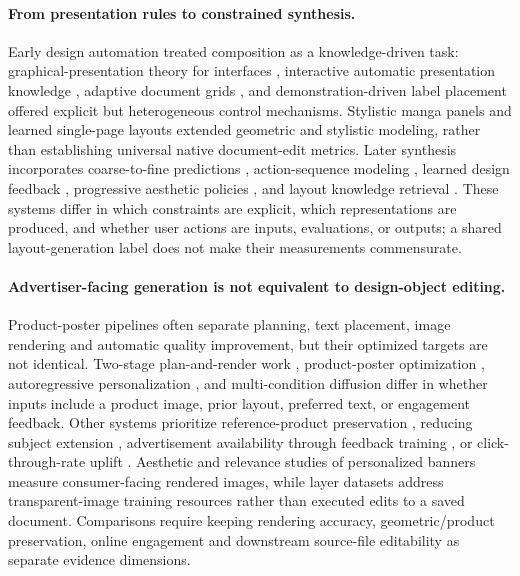 \paragraph{From presentation rules to constrained synthesis.}
Early design automation treated composition as a knowledge-driven task: graphical-presentation theory for interfaces \citep{mackinlay1988gui}, interactive automatic presentation knowledge \citep{roth1994interactive}, adaptive document grids \citep{jacobs2003adaptivegrid}, and demonstration-driven label placement \citep{vollick2007labelstyles} offered explicit but heterogeneous control mechanisms.
Stylistic manga panels \citep{cao2012mangalayout} and learned single-page layouts \citep{odonovan2014singlepage} extended geometric and stylistic modeling, rather than establishing universal native document-edit metrics.
Later synthesis incorporates coarse-to-fine predictions \citep{jiang2022coarsefine}, action-sequence modeling \citep{yang2023layoutaction}, learned design feedback \citep{ishiyama2023appropriateness}, progressive aesthetic policies \citep{patnaik2026idesign}, and layout knowledge retrieval \citep{tang2024layoutkag}.
These systems differ in which constraints are explicit, which representations are produced, and whether user actions are inputs, evaluations, or outputs; a shared layout-generation label does not make their measurements commensurate.

\paragraph{Advertiser-facing generation is not equivalent to design-object editing.}
Product-poster pipelines often separate planning, text placement, image rendering and automatic quality improvement, but their optimized targets are not identical.
Two-stage plan-and-render work \citep{planningrendering2023}, product-poster optimization \citep{autopp2025}, autoregressive personalization \citep{designyourad2026}, and multi-condition diffusion \citep{innoads2026} differ in whether inputs include a product image, prior layout, preferred text, or engagement feedback.
Other systems prioritize reference-product preservation \citep{refadgen2026}, reducing subject extension \citep{simpleposter2026}, advertisement availability through feedback training \citep{reliablead2024}, or click-through-rate uplift \citep{cg4ctr2024}.
Aesthetic and relevance studies of personalized banners \citep{ecommercebanners2024} measure consumer-facing rendered images, while layer datasets \citep{prismlayers2025} address transparent-image training resources rather than executed edits to a saved document.
Comparisons require keeping rendering accuracy, geometric/product preservation, online engagement and downstream source-file editability as separate evidence dimensions.


